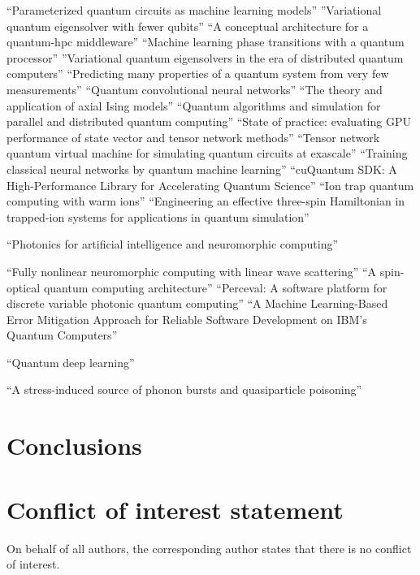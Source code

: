 \documentclass[]{article}
\begin{document}
\cite{Benedetti_2019}
``Parameterized quantum circuits as machine learning models''
\cite{PhysRevResearch.1.023025}
''Variational quantum eigensolver with fewer qubits''
\cite{saurabh2023conceptual}
``A conceptual architecture for a quantum-hpc middleware''
\cite{uvarov2020machine}
``Machine learning phase transitions with a quantum processor''
\cite{khait2023variational}
''Variational quantum eigensolvers in the era of distributed quantum computers''
\cite{huang2020predicting}
``Predicting many properties of a quantum system from very few measurements''
\cite{cong2019quantum}
``Quantum convolutional neural networks''
\cite{yeomans1988theory}
``The theory and application of axial Ising models''
\cite{parekh2021quantum}
``Quantum algorithms and simulation for parallel and distributed quantum computing''
\cite{vallero2024state}
``State of practice: evaluating GPU performance of state vector and tensor network methods''
\cite{nguyen2022tensor}
``Tensor network quantum virtual machine for simulating quantum circuits at exascale''
\cite{liu2024training}
``Training classical neural networks by quantum machine learning''
\cite{10313722}
``cuQuantum SDK: A High-Performance Library for Accelerating Quantum Science''
\cite{milburn2000ion}
``Ion trap quantum computing with warm ions''
\cite{Andrade_2022}
``Engineering an effective three-spin Hamiltonian in trapped-ion systems for applications in quantum simulation''

\cite{shastri2021photonics}
``Photonics for artificial intelligence and neuromorphic computing''

\cite{wanjura2024fully}
``Fully nonlinear neuromorphic computing with linear wave scattering''
\cite{de2024spin}
``A spin-optical quantum computing architecture''
\cite{heurtel2023perceval}
``Perceval: A software platform for discrete variable photonic quantum computing''
\cite{muqeet2024machine}
``A Machine Learning-Based Error Mitigation Approach for Reliable Software Development on IBM’s Quantum Computers''

\cite{wiebe2014quantum}
``Quantum deep learning''

\cite{anthony2024stress}
``A stress-induced source of phonon bursts and quasiparticle poisoning''

\section{Conclusions}


\section{Conflict of interest statement }

On behalf of all authors, the corresponding author states that there is no conflict of interest.


\end{document}
